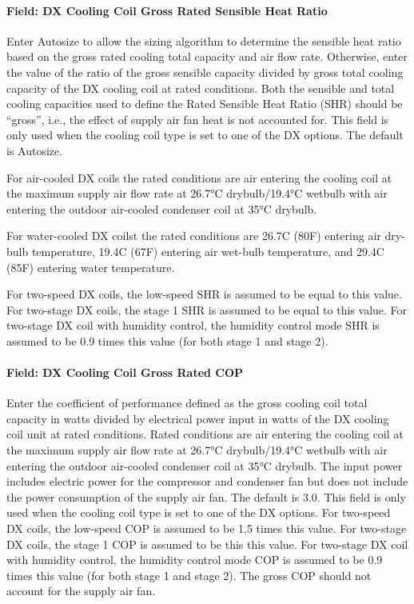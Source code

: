 \paragraph{Field: DX Cooling Coil Gross Rated Sensible Heat Ratio}\label{field-dx-cooling-coil-gross-rated-sensible-heat-ratio}

Enter Autosize to allow the sizing algorithm to determine the sensible heat ratio based on the gross rated cooling total capacity and air flow rate. Otherwise, enter the value of the ratio of the gross sensible capacity divided by gross total cooling capacity of the DX cooling coil at rated conditions. Both the sensible and total cooling capacities used to define the Rated Sensible Heat Ratio (SHR) should be ``gross'', i.e., the effect of supply air fan heat is not accounted for. This field is only used when the cooling coil type is set to one of the DX options. The default is Autosize.

For air-cooled DX coils the rated conditions are air entering the cooling coil at the maximum supply air flow rate at 26.7°C drybulb/19.4°C wetbulb with air entering the outdoor air-cooled condenser coil at 35°C drybulb.

For water-cooled DX coilst the rated conditions are 26.7C (80F) entering air dry-bulb temperature, 19.4C (67F) entering air wet-bulb temperature, and 29.4C (85F) entering water temperature.

For two-speed DX coils, the low-speed SHR is assumed to be equal to this value. For two-stage DX coils, the stage 1 SHR is assumed to be equal to this value. For two-stage DX coil with humidity control, the humidity control mode SHR is assumed to be 0.9 times this value (for both stage 1 and stage 2).

\paragraph{Field: DX Cooling Coil Gross Rated COP}\label{field-dx-cooling-coil-gross-rated-cop}

Enter the coefficient of performance defined as the gross cooling coil total capacity in watts divided by electrical power input in watts of the DX cooling coil unit at rated conditions. Rated conditions are air entering the cooling coil at the maximum supply air flow rate at 26.7°C drybulb/19.4°C wetbulb with air entering the outdoor air-cooled condenser coil at 35°C drybulb. The input power includes electric power for the compressor and condenser fan but does not include the power consumption of the supply air fan. The default is 3.0. This field is only used when the cooling coil type is set to one of the DX options. For two-speed DX coils, the low-speed COP is assumed to be 1.5 times this value. For two-stage DX coils, the stage 1 COP is assumed to be this this value. For two-stage DX coil with humidity control, the humidity control mode COP is assumed to be 0.9 times this value (for both stage 1 and stage 2). The gross COP should not account for the supply air fan.

